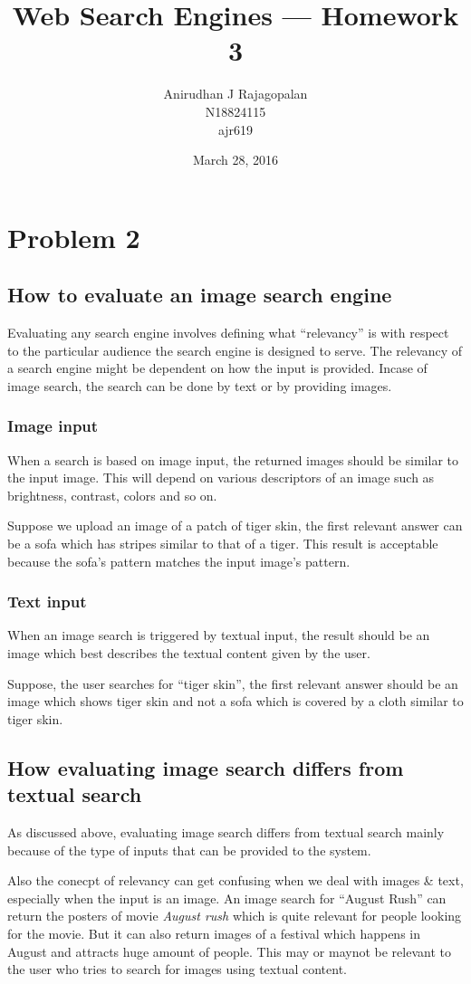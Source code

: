 \documentclass{article}
\begin{document}
\title{Web Search Engines --- Homework 3}
\date{March 28, 2016}
\author{Anirudhan J Rajagopalan\\ N18824115\\ ajr619}
\maketitle

\newpage

\section{Problem 2}
\subsection{How to evaluate an image search engine}
Evaluating any search engine involves defining what ``relevancy'' is with respect to the particular audience the search engine is designed to serve.
The relevancy of a search engine might be dependent on how the input is provided.  Incase of image search, the search can be done by text or by providing images.

\subsubsection{Image input}
When a search is based on image input, the returned images should be similar to the input image.  This will depend on various descriptors of an image such as brightness, contrast, colors and so on.

Suppose we upload an image of a patch of tiger skin, the first relevant answer can be a sofa which has stripes similar to that of a tiger.  This result is acceptable because the sofa's pattern matches the input image's pattern.

\subsubsection{Text input}
When an image search is triggered by textual input, the result should be an image which best describes the textual content given by the user.

Suppose, the user searches for ``tiger skin'', the first relevant answer should be an image which shows tiger skin and not a sofa which is covered by a cloth similar to tiger skin.

\subsection{How evaluating image search differs from textual search}
As discussed above, evaluating image search differs from textual search mainly because of the type of inputs that can be provided to the system.

Also the conecpt of relevancy can get confusing when we deal with images \& text, especially when the input is an image.  An image search for ``August Rush'' can return the posters of movie \textit{August rush} which is quite relevant for people looking for the movie.  But it can also return images of a festival which happens in August and attracts huge amount of people.  This may or maynot be relevant to the user who tries to search for images using textual content.
\end{document}
